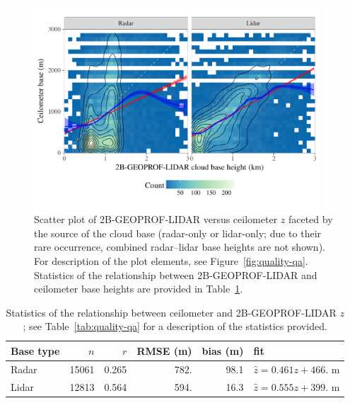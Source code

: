 \documentclass[essd,manuscript]{copernicus}\usepackage[]{graphicx}\usepackage[]{color}
\newenvironment{knitrout}{}{} %
\newcommand\CBH{\ensuremath{z}}
\begin{document}
\begin{figure}
  \centering

\begin{knitrout}
\color{fgcolor}

{\centering \includegraphics[width=0.95\textwidth]{figure/method-eval-2bgeoprof-1} 

}



\end{knitrout}
  \caption{Scatter plot of 2B-GEOPROF-LIDAR versus ceilometer \CBH{}
    faceted by the source of the cloud base (radar-only or lidar-only; due to
    their rare occurrence, combined radar--lidar base heights are not shown).
    For description of the plot elements, see Figure~\ref{fig:quality-qa}.  Statistics of the
    relationship between 2B-GEOPROF-LIDAR and ceilometer base heights are provided in
    Table~\ref{tab:2bgeoprof}.}
  \label{fig:eval-2b}
\end{figure}

\begin{table}
  \caption{Statistics of the relationship between ceilometer and
    2B-GEOPROF-LIDAR \CBH{}; see Table~\ref{tab:quality-qa} for a
    description of the statistics provided.}
  \label{tab:2bgeoprof}
  \centering
\begin{tabular}{lrrrrl}
  \hline
\hline
Base type & $n$ & $r$ & RMSE (m) & bias (m) & fit \\ 
  \hline
Radar & 15061 & 0.265 & 782. & 98.1 & $\hat{z} = 0.461 z + 466.$ m \\ 
  Lidar & 12813 & 0.564 & 594. & 16.3 & $\hat{z} = 0.555 z + 399.$ m \\ 
   \hline
\hline
\end{tabular}

\end{table}
\end{document}
